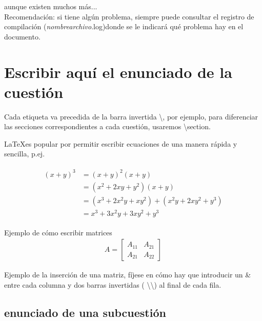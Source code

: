 aunque existen muchos más...\\

Recomendación: si tiene algún problema, siempre puede consultar el registro de compilación (\textit{nombrearchivo}.log)donde se le indicará qué problema hay en el documento.

\newpage


\section{Escribir aquí el enunciado de la cuestión}

Cada etiqueta va precedida de la barra invertida \textbackslash , por ejemplo, para diferenciar las secciones correspondientes a cada cuestión, usaremos \textbackslash section. 

\LaTeX es popular por permitir escribir ecuaciones de una manera rápida y sencilla, p.ej.

\begin{align} 
\begin{split}
(x+y)^3 	&= (x+y)^2(x+y)\\
&=(x^2+2xy+y^2)(x+y)\\
&=(x^3+2x^2y+xy^2) + (x^2y+2xy^2+y^3)\\
&=x^3+3x^2y+3xy^2+y^3
\end{split}					
\end{align}

Ejemplo de cómo escribir matrices
\begin{align}
A = 
\begin{bmatrix}
A_{11} & A_{21} \\
A_{21} & A_{22}
\end{bmatrix}
\end{align}

Ejemplo de la inserción de una matriz, fíjese en cómo hay que introducir un \& entre cada columna y dos barras invertidas ( \textbackslash\textbackslash ) al final de cada fila.



\subsection{enunciado de una subcuestión}

